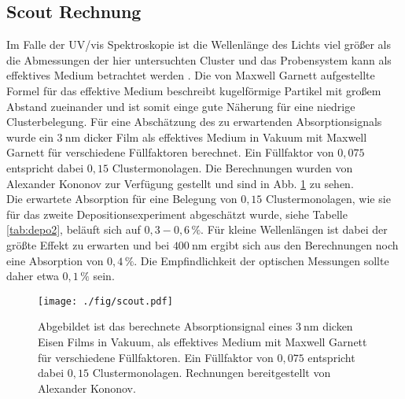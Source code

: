 \subsection{Scout Rechnung}
\label{sec:scoutsim}
Im Falle der UV/vis Spektroskopie ist die Wellenlänge des Lichts viel größer als die Abmessungen der hier untersuchten Cluster und das Probensystem kann als effektives Medium betrachtet werden \cite[S. 149 ff.]{Thei.1993}.
Die von Maxwell Garnett aufgestellte Formel für das effektive Medium beschreibt kugelförmige Partikel mit großem Abstand zueinander und ist somit einge gute Näherung für eine niedrige Clusterbelegung. 
Für eine Abschätzung des zu erwartenden Absorptionsignals wurde ein $\SI{3}{\nm}$ dicker Film als effektives Medium in Vakuum mit Maxwell Garnett für verschiedene Füllfaktoren berechnet.
Ein Füllfaktor von $0,075$ entspricht dabei $0,15$ Clustermonolagen.
Die Berechnungen wurden von Alexander Kononov zur Verfügung gestellt und sind in Abb. \ref{fig:scout} zu sehen.\\
Die erwartete Absorption für eine Belegung von $0,15$ Clustermonolagen, wie sie für das zweite Depositionsexperiment abgeschätzt wurde, siehe Tabelle \ref{tab:depo2}, beläuft sich auf $0,3 - 0,6\,\%$.
Für kleine Wellenlängen ist dabei der größte Effekt zu erwarten und bei $\SI{400}{\nm}$ ergibt sich aus den Berechnungen noch eine Absorption von $0,4\,\%$. Die Empfindlichkeit der optischen Messungen sollte daher etwa $0,1\,\%$ sein.
\begin{figure}[h]
  \centering
  \texttt{[image: ./fig/scout.pdf]}
  \caption{Abgebildet ist das berechnete Absorptionsignal eines $\SI{3}{\nm}$ dicken Eisen Films in Vakuum, als effektives Medium mit Maxwell Garnett für verschiedene Füllfaktoren. Ein Füllfaktor von $0,075$ entspricht dabei $0,15$ Clustermonolagen. Rechnungen bereitgestellt von Alexander Kononov.}
  \label{fig:scout}
\end{figure}

